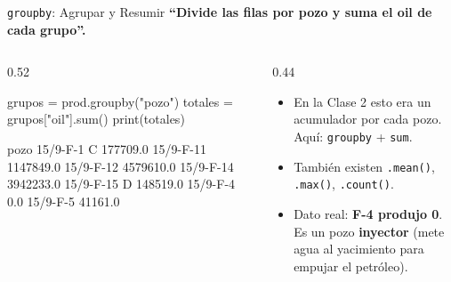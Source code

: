 \documentclass[aspectratio=169, 11pt]{beamer}
\begin{document}
\begin{frame}[fragile,shrink=25]{\texttt{groupby}: Agrupar y Resumir}
  \vspace{-4pt}
  {\small\color{arcaDark}\bfseries
    ``Divide las filas por pozo y suma el oil de cada grupo''.}

  \vspace{4pt}
  \begin{columns}[T]
    \begin{column}{0.52\textwidth}
      \begin{pyblock}
grupos = prod.groupby("pozo")
totales = grupos["oil"].sum()
print(totales)
      \end{pyblock}
      \vspace{2pt}
      \begin{outputblock}
pozo
15/9-F-1 C      177709.0
15/9-F-11      1147849.0
15/9-F-12      4579610.0
15/9-F-14      3942233.0
15/9-F-15 D     148519.0
15/9-F-4             0.0
15/9-F-5         41161.0
      \end{outputblock}
    \end{column}

    \begin{column}{0.44\textwidth}
      {\scriptsize\color{textMuted}
      \begin{itemize}\setlength{\itemsep}{5pt}
        \item[{\color{arcaRed}\scriptsize\faArrowRight}]
          En la Clase 2 esto era un acumulador
          por cada pozo. Aquí: \texttt{groupby} +
          \texttt{sum}.
        \item[{\color{arcaRed}\scriptsize\faArrowRight}]
          También existen \texttt{.mean()},
          \texttt{.max()}, \texttt{.count()}.
        \item[{\color{codeGreen}\scriptsize\faCheck}]
          Dato real: \textbf{F-4 produjo 0}. Es un
          pozo \textbf{inyector} (mete agua al
          yacimiento para empujar el petróleo).
      \end{itemize}
      }
    \end{column}
  \end{columns}
\end{frame}
\end{document}
